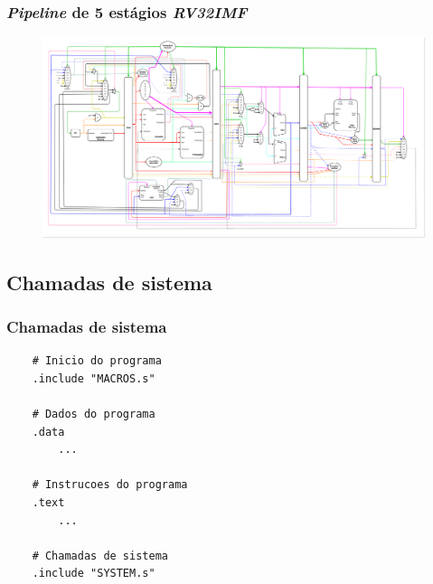 \documentclass[aspectratio=169]{beamer}
\begin{document}
    \begin{frame}
        \frametitle{\textit{Pipeline} de 5 estágios \textit{RV32IMF}}
        \vfill
        \begin{figure}[H]
        \centering
            \includegraphics[width=.99\textwidth,height=.85\textheight,keepaspectratio]{../images/uarch_diagrams/pipeline-RV32IMF.png}
        \end{figure}
        \vfill
    \end{frame}

    \subsection{Chamadas de sistema}
    \begin{frame}[fragile]
        \frametitle{Chamadas de sistema}
        \vfill
        \begin{lstlisting}
    # Inicio do programa
    .include "MACROS.s"

    # Dados do programa
    .data
        ...

    # Instrucoes do programa
    .text
        ...

    # Chamadas de sistema
    .include "SYSTEM.s"
        \end{lstlisting}
        \vfill
    \end{frame}
\end{document}
